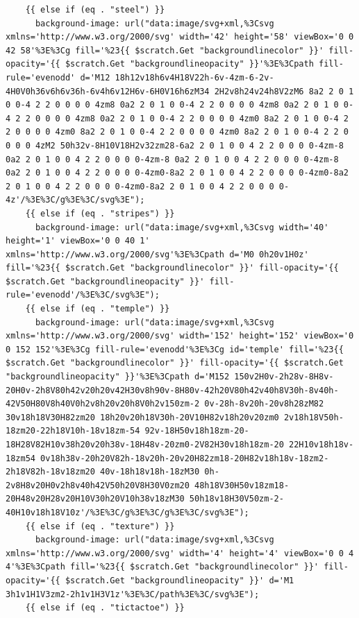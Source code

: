 \documentclass[11pt]{article}
\begin{document}
\begin{enumerate}
\begin{verbatim}
    {{ else if (eq . "steel") }}
      background-image: url("data:image/svg+xml,%3Csvg xmlns='http://www.w3.org/2000/svg' width='42' height='58' viewBox='0 0 42 58'%3E%3Cg fill='%23{{ $scratch.Get "backgroundlinecolor" }}' fill-opacity='{{ $scratch.Get "backgroundlineopacity" }}'%3E%3Cpath fill-rule='evenodd' d='M12 18h12v18h6v4H18V22h-6v-4zm-6-2v-4H0V0h36v6h6v36h-6v4h6v12H6v-6H0V16h6zM34 2H2v8h24v24h8V2zM6 8a2 2 0 1 0 0-4 2 2 0 0 0 0 4zm8 0a2 2 0 1 0 0-4 2 2 0 0 0 0 4zm8 0a2 2 0 1 0 0-4 2 2 0 0 0 0 4zm8 0a2 2 0 1 0 0-4 2 2 0 0 0 0 4zm0 8a2 2 0 1 0 0-4 2 2 0 0 0 0 4zm0 8a2 2 0 1 0 0-4 2 2 0 0 0 0 4zm0 8a2 2 0 1 0 0-4 2 2 0 0 0 0 4zM2 50h32v-8H10V18H2v32zm28-6a2 2 0 1 0 0 4 2 2 0 0 0 0-4zm-8 0a2 2 0 1 0 0 4 2 2 0 0 0 0-4zm-8 0a2 2 0 1 0 0 4 2 2 0 0 0 0-4zm-8 0a2 2 0 1 0 0 4 2 2 0 0 0 0-4zm0-8a2 2 0 1 0 0 4 2 2 0 0 0 0-4zm0-8a2 2 0 1 0 0 4 2 2 0 0 0 0-4zm0-8a2 2 0 1 0 0 4 2 2 0 0 0 0-4z'/%3E%3C/g%3E%3C/svg%3E");
    {{ else if (eq . "stripes") }}
      background-image: url("data:image/svg+xml,%3Csvg width='40' height='1' viewBox='0 0 40 1' xmlns='http://www.w3.org/2000/svg'%3E%3Cpath d='M0 0h20v1H0z' fill='%23{{ $scratch.Get "backgroundlinecolor" }}' fill-opacity='{{ $scratch.Get "backgroundlineopacity" }}' fill-rule='evenodd'/%3E%3C/svg%3E");
    {{ else if (eq . "temple") }}
      background-image: url("data:image/svg+xml,%3Csvg xmlns='http://www.w3.org/2000/svg' width='152' height='152' viewBox='0 0 152 152'%3E%3Cg fill-rule='evenodd'%3E%3Cg id='temple' fill='%23{{ $scratch.Get "backgroundlinecolor" }}' fill-opacity='{{ $scratch.Get "backgroundlineopacity" }}'%3E%3Cpath d='M152 150v2H0v-2h28v-8H8v-20H0v-2h8V80h42v20h20v42H30v8h90v-8H80v-42h20V80h42v40h8V30h-8v40h-42V50H80V8h40V0h2v8h20v20h8V0h2v150zm-2 0v-28h-8v20h-20v8h28zM82 30v18h18V30H82zm20 18h20v20h18V30h-20V10H82v18h20v20zm0 2v18h18V50h-18zm20-22h18V10h-18v18zm-54 92v-18H50v18h18zm-20-18H28V82H10v38h20v20h38v-18H48v-20zm0-2V82H30v18h18zm-20 22H10v18h18v-18zm54 0v18h38v-20h20V82h-18v20h-20v20H82zm18-20H82v18h18v-18zm2-2h18V82h-18v18zm20 40v-18h18v18h-18zM30 0h-2v8H8v20H0v2h8v40h42V50h20V8H30V0zm20 48h18V30H50v18zm18-20H48v20H28v20H10V30h20V10h38v18zM30 50h18v18H30V50zm-2-40H10v18h18V10z'/%3E%3C/g%3E%3C/g%3E%3C/svg%3E");
    {{ else if (eq . "texture") }}
      background-image: url("data:image/svg+xml,%3Csvg xmlns='http://www.w3.org/2000/svg' width='4' height='4' viewBox='0 0 4 4'%3E%3Cpath fill='%23{{ $scratch.Get "backgroundlinecolor" }}' fill-opacity='{{ $scratch.Get "backgroundlineopacity" }}' d='M1 3h1v1H1V3zm2-2h1v1H3V1z'%3E%3C/path%3E%3C/svg%3E");
    {{ else if (eq . "tictactoe") }}

\end{verbatim}
\end{enumerate}
\end{document}
